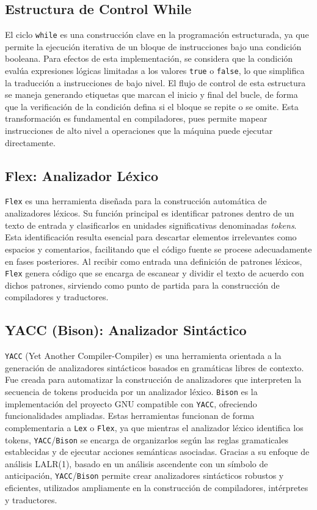 \documentclass{article}
\begin{document}
\subsection*{Estructura de Control While}

El ciclo \texttt{while} es una construcción clave en la programación estructurada, ya que permite la ejecución iterativa de un bloque de instrucciones bajo una condición booleana. Para efectos de esta implementación, se considera que la condición evalúa expresiones lógicas limitadas a los valores \texttt{true} o \texttt{false}, lo que simplifica la traducción a instrucciones de bajo nivel. El flujo de control de esta estructura se maneja generando etiquetas que marcan el inicio y final del bucle, de forma que la verificación de la condición defina si el bloque se repite o se omite. Esta transformación es fundamental en compiladores, pues permite mapear instrucciones de alto nivel a operaciones que la máquina puede ejecutar directamente.

\subsection*{Flex: Analizador Léxico}

\texttt{Flex} es una herramienta diseñada para la construcción automática de analizadores léxicos. Su función principal es identificar patrones dentro de un texto de entrada y clasificarlos en unidades significativas denominadas \emph{tokens}. Esta identificación resulta esencial para descartar elementos irrelevantes como espacios y comentarios, facilitando que el código fuente se procese adecuadamente en fases posteriores. Al recibir como entrada una definición de patrones léxicos, \texttt{Flex} genera código que se encarga de escanear y dividir el texto de acuerdo con dichos patrones, sirviendo como punto de partida para la construcción de compiladores y traductores.

\subsection*{YACC (Bison): Analizador Sintáctico}

\texttt{YACC} (Yet Another Compiler-Compiler) es una herramienta orientada a la generación de analizadores sintácticos basados en gramáticas libres de contexto. Fue creada para automatizar la construcción de analizadores que interpreten la secuencia de tokens producida por un analizador léxico. \texttt{Bison} es la implementación del proyecto GNU compatible con \texttt{YACC}, ofreciendo funcionalidades ampliadas. Estas herramientas funcionan de forma complementaria a \texttt{Lex} o \texttt{Flex}, ya que mientras el analizador léxico identifica los tokens, \texttt{YACC}/\texttt{Bison} se encarga de organizarlos según las reglas gramaticales establecidas y de ejecutar acciones semánticas asociadas. Gracias a su enfoque de análisis LALR(1), basado en un análisis ascendente con un símbolo de anticipación, \texttt{YACC}/\texttt{Bison} permite crear analizadores sintácticos robustos y eficientes, utilizados ampliamente en la construcción de compiladores, intérpretes y traductores.
\end{document}
